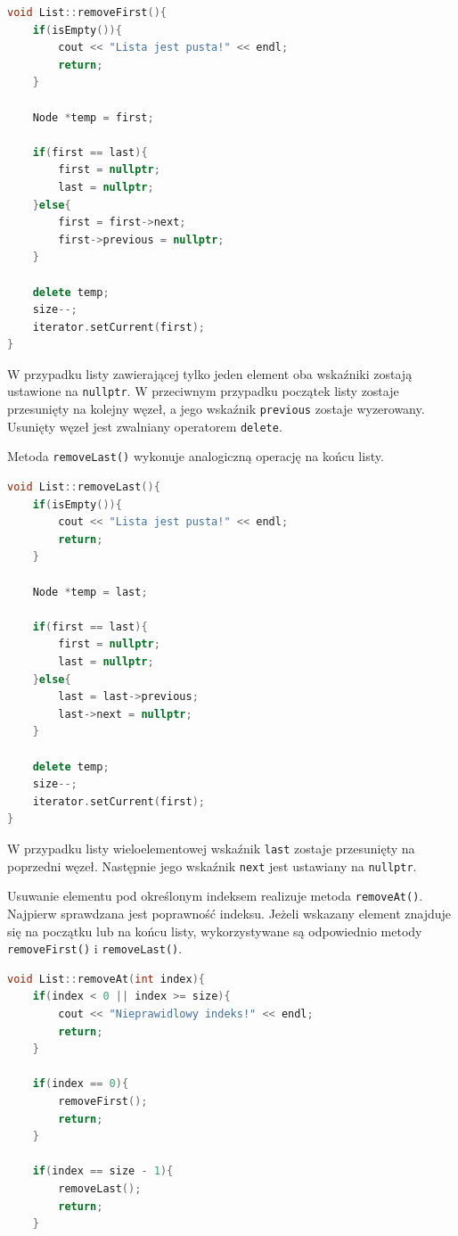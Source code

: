 \begin{lstlisting}[language=C++, caption={Usuwanie pierwszego elementu}]
void List::removeFirst(){
    if(isEmpty()){
        cout << "Lista jest pusta!" << endl;
        return;
    }

    Node *temp = first;

    if(first == last){
        first = nullptr;
        last = nullptr;
    }else{
        first = first->next;
        first->previous = nullptr;
    }

    delete temp;
    size--;
    iterator.setCurrent(first);
}
\end{lstlisting}

W przypadku listy zawierającej tylko jeden element oba wskaźniki zostają ustawione na \texttt{nullptr}. W przeciwnym przypadku początek listy zostaje przesunięty na kolejny węzeł, a jego wskaźnik \texttt{previous} zostaje wyzerowany. Usunięty węzeł jest zwalniany operatorem \texttt{delete}.

Metoda \texttt{removeLast()} wykonuje analogiczną operację na końcu listy.

\begin{lstlisting}[language=C++, caption={Usuwanie ostatniego elementu}]
void List::removeLast(){
    if(isEmpty()){
        cout << "Lista jest pusta!" << endl;
        return;
    }

    Node *temp = last;

    if(first == last){
        first = nullptr;
        last = nullptr;
    }else{
        last = last->previous;
        last->next = nullptr;
    }

    delete temp;
    size--;
    iterator.setCurrent(first);
}
\end{lstlisting}

W przypadku listy wieloelementowej wskaźnik \texttt{last} zostaje przesunięty na poprzedni węzeł. Następnie jego wskaźnik \texttt{next} jest ustawiany na \texttt{nullptr}.

Usuwanie elementu pod określonym indeksem realizuje metoda \texttt{removeAt()}. Najpierw sprawdzana jest poprawność indeksu. Jeżeli wskazany element znajduje się na początku lub na końcu listy, wykorzystywane są odpowiednio metody \texttt{removeFirst()} i \texttt{removeLast()}.

\begin{lstlisting}[language=C++, caption={Sprawdzanie indeksu w metodzie removeAt}]
void List::removeAt(int index){
    if(index < 0 || index >= size){
        cout << "Nieprawidlowy indeks!" << endl;
        return;
    }

    if(index == 0){
        removeFirst();
        return;
    }

    if(index == size - 1){
        removeLast();
        return;
    }
\end{lstlisting}

